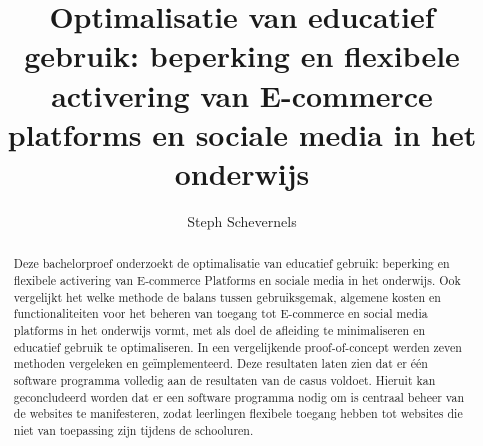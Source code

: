 \documentclass{hogent-article}
\title{Optimalisatie van educatief gebruik: beperking en flexibele activering van E-commerce platforms en sociale media in het onderwijs}
\author{Steph Schevernels}
\begin{document}
\begin{abstract}
   Deze bachelorproef onderzoekt de optimalisatie van educatief gebruik: beperking en flexibele activering van E-commerce Platforms en sociale media in het onderwijs. Ook vergelijkt het welke methode de balans tussen gebruiksgemak, algemene kosten en functionaliteiten voor het beheren van toegang tot E-commerce en social media platforms in het onderwijs vormt, met als doel de afleiding te minimaliseren en educatief gebruik te optimaliseren. In een vergelijkende proof-of-concept werden zeven methoden vergeleken en geïmplementeerd. Deze resultaten laten zien dat er één software programma volledig aan de resultaten van de casus voldoet. Hieruit kan geconcludeerd worden dat er een software programma nodig om is centraal beheer van de websites te manifesteren, zodat leerlingen flexibele toegang hebben tot websites die niet van toepassing zijn tijdens de schooluren.
\end{abstract}

\tableofcontents



\printbibliography[heading=bibintoc]
\end{document}
